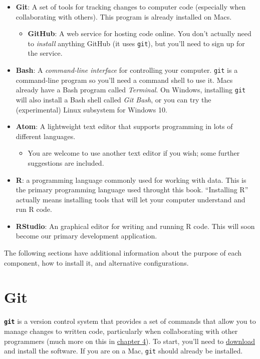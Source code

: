 \documentclass[]{book}
\providecommand{\tightlist}{%
  \setlength{\itemsep}{0pt}\setlength{\parskip}{0pt}}
\theoremstyle{definition}
\theoremstyle{definition}
\theoremstyle{remark}
\begin{document}
\begin{itemize}
\item
  \textbf{Git}: A set of tools for tracking changes to computer code
  (especially when collaborating with others). This program is already
  installed on Macs.

  \begin{itemize}
  \tightlist
  \item
    \textbf{GitHub}: A web service for hosting code online. You don't
    actually need to \emph{install} anything GitHub (it uses
    \texttt{git}), but you'll need to sign up for the service.
  \end{itemize}
\item
  \textbf{Bash}: A \emph{command-line interface} for controlling your
  computer. \texttt{git} is a command-line program so you'll need a
  command shell to use it. Macs already have a Bash program called
  \emph{Terminal}. On Windows, installing \texttt{git} will also install
  a Bash shell called \emph{Git Bash}, or you can try the (experimental)
  Linux subsystem for Windows 10.
\item
  \textbf{Atom}: A lightweight text editor that supports programming in
  lots of different languages.

  \begin{itemize}
  \tightlist
  \item
    You are welcome to use another text editor if you wish; some further
    suggestions are included.
  \end{itemize}
\item
  \textbf{R}: a programming language commonly used for working with
  data. This is the primary programming language used throught this
  book. ``Installing R'' actually means installing tools that will let
  your computer understand and run R code.
\item
  \textbf{RStudio}: An graphical editor for writing and running R code.
  This will soon become our primary development application.
\end{itemize}

The following sections have additional information about the purpose of
each component, how to install it, and alternative configurations.

\section{Git}\label{git}

\textbf{\texttt{git}} is a version control system that provides a set of
commands that allow you to manage changes to written code, particularly
when collaborating with other programmers (much more on this in
\protect\hyperlink{git-basics}{chapter 4}). To start, you'll need to
\href{https://git-scm.com/downloads}{download} and install the software.
If you are on a Mac, \texttt{git} should already be installed.
\end{document}
